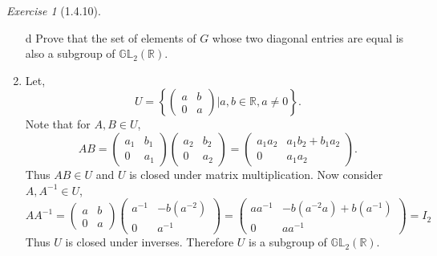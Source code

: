 \documentclass[12pt]{amsart}
\makeatletter
\theoremstyle{remark}
\newtheorem*{exercise}{Exercise}%
\def\RR{\ensuremath{\mathbb R}} %
\renewenvironment{proof}[1][\proofname]{\par\doublespacing
  \pushQED{\qed}%
  \normalfont \topsep6\p@\@plus6\p@\relax
  \list{}{%
    \settowidth{\leftmargin}{\itshape\proofname:\hskip\labelsep}%
    \setlength{\labelwidth}{0pt}%
    \setlength{\itemindent}{-\leftmargin}%
  }%
  \item[\hskip\labelsep\itshape#1\@addpunct{:}]\ignorespaces
}{%
  \popQED\endlist\@endpefalse
  \singlespacing
}
\theoremstyle{mycomment}
\makeatother
\begin{document}
\begin{exercise}[1.4.10]
\begin{enumerate}
    \item[d] Prove that the set of elements of $G$ whose two diagonal entries are equal is also a subgroup of $\mathbb{G}\mathbb{L}_2(\mathbb{R})$.
    \begin{proof} Let,
      \begin{equation*}
        U = \left\{\begin{pmatrix}
          a & b\\
          0 & a
        \end{pmatrix}| a,b \in \RR, a \neq 0\right\}.  
      \end{equation*}
      Note that for $A, B \in U$, 
      \begin{equation*}
        AB = 
        \begin{pmatrix}
          a_1 & b_1\\
          0 & a_1
        \end{pmatrix}
        \begin{pmatrix}
          a_2 & b_2\\
          0 & a_2
        \end{pmatrix}
        = \begin{pmatrix}a_1a_2&a_1b_2+b_1a_2\\ 0&a_1a_2\end{pmatrix}.
      \end{equation*}
      Thus $AB \in U$ and $U$ is closed under matrix multiplication. 
      Now consider $A, A^{-1} \in U$, 
      \begin{equation*}
        AA^{-1} = 
        \begin{pmatrix}
          a & b\\
          0 & a
        \end{pmatrix}
        \begin{pmatrix}
          a^{-1} & -b(a^{-2})\\
          0 & a^{-1}
        \end{pmatrix}
         =
         \begin{pmatrix}
          aa^{-1} & -b(a^{-2}a) + b(a^{-1})\\
          0 & aa^{-1}
        \end{pmatrix}
         = I_2
      \end{equation*}
      Thus $U$ is closed under inverses. Therefore $U$ is a subgroup of $\mathbb{G}\mathbb{L}_2(\mathbb{R})$.
    \end{proof}
  \end{enumerate}
\end{exercise}
\end{document}
